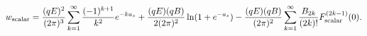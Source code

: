 \begin{equation}
w_{\rm scalar} = \frac{(qE)^2}{(2 \pi)^3} \sum_{k = 1}^{\infty}
\frac{(-1)^{k+1}}{k^2} e^{-k a_s} +
\frac{(qE)(qB)}{2(2 \pi)^2} \ln (1 + e^{- a_s} ) - 
\frac{(qE)(qB)}{(2 \pi)^2} \sum_{k = 1}^{\infty} 
\frac{B_{2k}}{(2k)!} F_{\rm scalar}^{(2k-1)} (0). \label{b-p2} 
\end{equation} 
